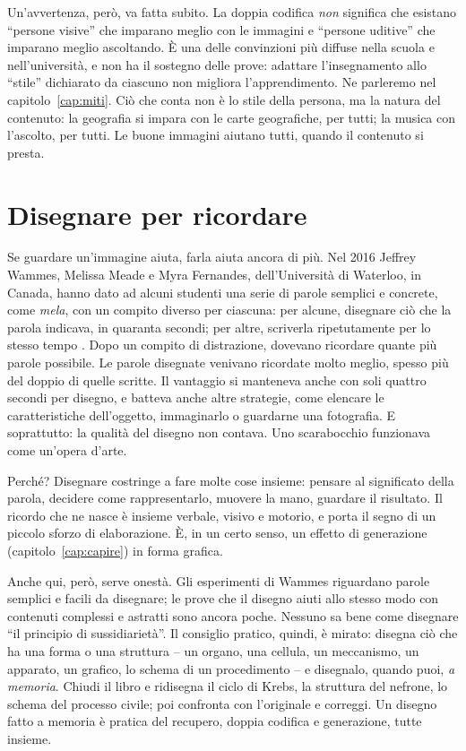 Un'avvertenza, però, va fatta subito. La doppia codifica \emph{non}
significa che esistano \enquote{persone visive} che imparano meglio con
le immagini e \enquote{persone uditive} che imparano meglio ascoltando.
È una delle convinzioni più diffuse nella scuola e nell'università, e
non ha il sostegno delle prove: adattare l'insegnamento allo
\enquote{stile} dichiarato da ciascuno non migliora l'apprendimento. Ne
parleremo nel capitolo~\ref{cap:miti}. Ciò che conta non è lo stile
della persona, ma la natura del contenuto: la geografia si impara con
le carte geografiche, per tutti; la musica con l'ascolto, per tutti.
Le buone immagini aiutano tutti, quando il contenuto si presta.

\section{Disegnare per ricordare}

Se guardare un'immagine aiuta, farla aiuta ancora di più. Nel 2016
Jeffrey Wammes, Melissa Meade e Myra Fernandes, dell'Università di
Waterloo, in Canada, hanno dato ad alcuni studenti una serie di parole
semplici e concrete, come \emph{mela}, con un compito diverso per
ciascuna: per alcune, disegnare ciò che la parola indicava, in quaranta
secondi; per altre, scriverla ripetutamente per lo stesso tempo
\parencite{wammes2016}. Dopo un compito di distrazione, dovevano
ricordare quante più parole possibile. Le parole disegnate venivano
ricordate molto meglio, spesso più del doppio di quelle scritte. Il
vantaggio si manteneva anche con soli quattro secondi per disegno, e
batteva anche altre strategie, come elencare le caratteristiche
dell'oggetto, immaginarlo o guardarne una fotografia. E soprattutto: la
qualità del disegno non contava. Uno scarabocchio funzionava come
un'opera d'arte.

Perché? Disegnare costringe a fare molte cose insieme: pensare al
significato della parola, decidere come rappresentarlo, muovere la mano,
guardare il risultato. Il ricordo che ne nasce è insieme verbale,
visivo e motorio, e porta il segno di un piccolo sforzo di elaborazione.
È, in un certo senso, un effetto di generazione
(capitolo~\ref{cap:capire}) in forma grafica.

Anche qui, però, serve onestà. Gli esperimenti di Wammes riguardano
parole semplici e facili da disegnare; le prove che il disegno aiuti
allo stesso modo con contenuti complessi e astratti sono ancora poche.
Nessuno sa bene come disegnare \enquote{il principio di sussidiarietà}.
Il consiglio pratico, quindi, è mirato: disegna ciò che ha una forma o
una struttura -- un organo, una cellula, un meccanismo, un apparato, un
grafico, lo schema di un procedimento -- e disegnalo, quando puoi,
\emph{a memoria}. Chiudi il libro e ridisegna il ciclo di Krebs, la
struttura del nefrone, lo schema del processo civile; poi confronta con
l'originale e correggi. Un disegno fatto a memoria è pratica del
recupero, doppia codifica e generazione, tutte insieme.

